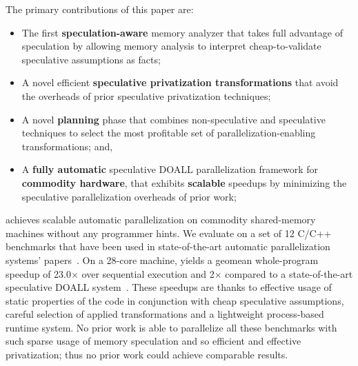 The primary contributions of this paper are:
\begin{itemize}

\item The first \textbf{speculation-aware} memory analyzer that takes
full advantage of speculation by allowing memory analysis to interpret
cheap-to-validate speculative assumptions as facts;

\item A novel efficient \textbf{speculative privatization transformations}
that avoid the overheads of prior speculative privatization
techniques;

\item A novel \textbf{planning} phase that combines non-speculative
and speculative techniques to select the most profitable set of
parallelization-enabling transformations; and,

\item A \textbf{fully automatic} speculative DOALL parallelization
framework for \textbf{commodity hardware}, that exhibits
\textbf{scalable} speedups by minimizing the speculative
parallelization overheads of prior work;

\end{itemize}

\name achieves scalable automatic parallelization on commodity
shared-memory machines without any programmer hints.  We evaluate
\name on a set of 12 C/C++ benchmarks that have been used in
state-of-the-art automatic parallelization systems'
papers~\cite{johnson:12:pldi,kim:12:cgo,campanoni:12:cgo}. On a
28-core machine, \name yields a geomean whole-program speedup of
23.0$\times$ over sequential execution and 2$\times$ compared to a
state-of-the-art speculative DOALL system~\cite{johnson:12:pldi}.
These speedups are thanks to effective usage of static properties of
the code in conjunction with cheap speculative assumptions,
%
careful selection of applied transformations and a lightweight
process-based runtime system.  No prior work is able to parallelize
all these benchmarks with such sparse usage of memory speculation and
so efficient and effective privatization; thus no prior work could
achieve comparable results.
